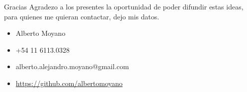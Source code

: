 \documentclass[14pt,aspectratio=169]{beamer}
\begin{document}
\begin{frame}{Gracias}
	Agradezo a los presentes la oportunidad de poder difundir estas ideas, para quienes me quieran contactar, dejo mis datos.
\begin{itemize}
	\item Alberto Moyano
	\item +54 11 6113.0328
	\item alberto.alejandro.moyano@gmail.com
	\item \url{https://github.com/albertomoyano}
\end{itemize}
\end{frame}

\end{document}
